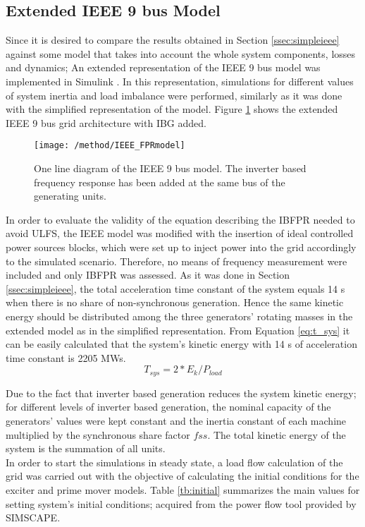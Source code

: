 \subsection{Extended IEEE 9 bus Model}

Since it is desired to compare the results obtained in Section \ref{ssec:simpleieee} against some model that takes into account the whole system components, losses and dynamics; An  extended representation of the IEEE 9 bus model was implemented in Simulink \cite{delavari2018simscape}. In this representation, simulations for different values of system inertia and load imbalance were performed, similarly as it was done with the simplified representation of the model. Figure \ref{fig:ieeeext} shows the extended IEEE 9 bus grid architecture with IBG added.\\
\begin{figure}[h]
	\centering
	\texttt{[image: /method/IEEE\_FPRmodel]}
	\caption{One line diagram of the IEEE 9 bus model. The inverter based frequency response has been added at the same bus of the generating units.}
	\label{fig:ieeeext}
\end{figure}
In order to evaluate the validity of the equation describing the IBFPR needed to avoid ULFS, the IEEE model was modified with the insertion of ideal controlled power sources blocks, which were set up to inject power into the grid accordingly to the simulated scenario. Therefore, no means of frequency measurement were included and only IBFPR was assessed.
As it was done in Section \ref{ssec:simpleieee}, the total acceleration time constant of the system equals 14 s when there is no share of non-synchronous generation. Hence the same kinetic energy should be distributed among the three generators' rotating masses in the extended model as in the simplified representation. From Equation \eqref{eq:t_sys} it can be easily calculated that the system's kinetic energy with 14 s of acceleration time constant is 2205 MWs.
\begin{equation}
	\label{eq:t_sys}
	T_{sys}=2*E_{k} /P_{load}
\end{equation}

Due to the fact that inverter based generation reduces the system kinetic energy; for different levels of inverter based generation, the nominal capacity of the generators' values were kept constant and the inertia constant of each machine multiplied by the synchronous share factor $ fss $. The total kinetic energy of the system is the summation of all units.\\
In order to start the simulations in steady state, a load flow calculation of the grid was carried out with the objective of calculating the initial conditions for the exciter and prime mover models.
Table \ref{tb:initial} summarizes the main values for setting system's initial conditions; acquired from the power flow tool provided by SIMSCAPE.


